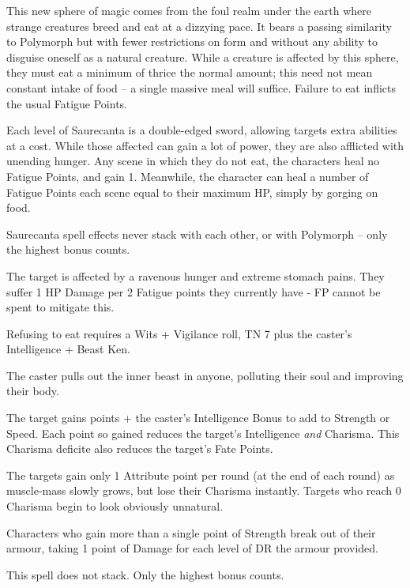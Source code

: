 \begin{multicols}{2}

This new sphere of magic comes from the foul realm under the earth where strange creatures breed and eat at a dizzying pace.
It bears a passing similarity to Polymorph but with fewer restrictions on form and without any ability to disguise oneself as a natural creature.
While a creature is affected by this sphere, they must eat a minimum of thrice the normal amount; this need not mean constant intake of food -- a single massive meal will suffice.
Failure to eat inflicts the usual Fatigue Points.

Each level of Saurecanta is a double-edged sword, allowing targets extra abilities at a cost.
While those affected can gain a lot of power, they are also afflicted with unending hunger.
Any scene in which they do not eat, the characters heal no Fatigue Points, and gain 1.
Meanwhile, the character can heal a number of Fatigue Points each scene equal to their maximum HP, simply by gorging on food.

Saurecanta spell effects never stack with each other, or with Polymorph -- only the highest bonus counts.

\spelllevel \label{saurecantaone}
The target is affected by a ravenous hunger and extreme stomach pains.  They suffer 1 HP Damage per 2 Fatigue points they currently have - FP cannot be spent to mitigate this.

Refusing to eat requires a Wits + Vigilance roll, TN 7 plus the caster's Intelligence + Beast Ken.

\spelllevel
{}
The caster pulls out the inner beast in anyone, polluting their soul and improving their body.

The target gains  points + the caster's Intelligence Bonus to add to Strength or Speed.
Each point so gained reduces the target's Intelligence \emph{and} Charisma.
This Charisma deficite also reduces the target's Fate Points.

The targets gain only 1 Attribute point per round (at the end of each round) as muscle-mass slowly grows, but lose their Charisma instantly.
Targets who reach 0 Charisma begin to look obviously unnatural.

Characters who gain more than a single point of Strength break out of their armour, taking 1 point of Damage for each level of DR the armour provided.

This spell does not stack.
Only the highest bonus counts.


\end{multicols}
